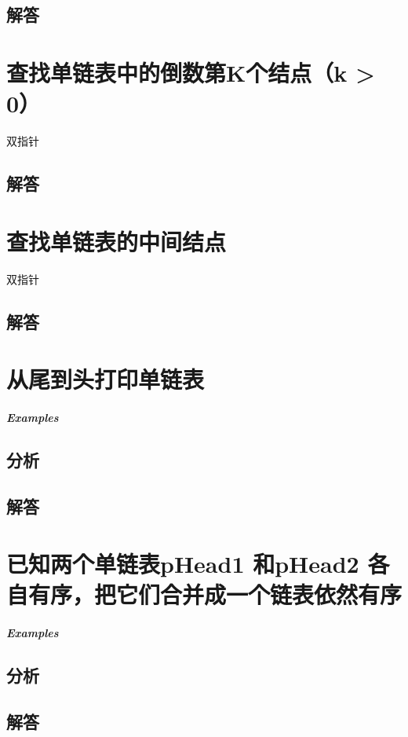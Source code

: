 \documentclass[UTF8,a4paper,12pt]{ctexbook}
\begin{document}
	\subsection{解答}
	
	
\section{查找单链表中的倒数第K个结点（k > 0）}
		双指针
	\subsection{解答}
	
	
\section{查找单链表的中间结点}
		双指针
	\subsection{解答}
	
	
\section{从尾到头打印单链表}
	
	\subparagraph{Examples}
	
	\subsection{分析}
	
	\subsection{解答}
	
	
\section{已知两个单链表pHead1 和pHead2 各自有序，把它们合并成一个链表依然有序}
	
	\subparagraph{Examples}
	
	\subsection{分析}
	
	\subsection{解答}
	
\end{document}
